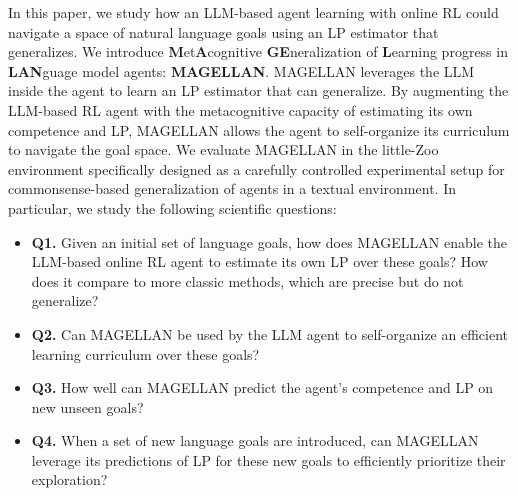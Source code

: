 


In this paper, we study how an LLM-based agent learning with online RL could navigate a space of natural language goals using an LP estimator that generalizes. We introduce \textbf{M}et\textbf{A}cognitive \textbf{GE}neralization of \textbf{L}earning progress in \textbf{LAN}guage model agents: \textbf{MAGELLAN}. MAGELLAN leverages the LLM inside the agent to learn an LP estimator that can generalize. By augmenting the LLM-based RL agent with the metacognitive capacity of estimating its own competence and LP, MAGELLAN allows the agent to self-organize its curriculum to navigate the goal space. We evaluate MAGELLAN in the little-Zoo environment specifically designed as a carefully controlled experimental setup for commonsense-based generalization of agents in a textual environment. In particular, we study the following scientific questions:
\begin{itemize}
    \item \textbf{Q1.} Given an initial set of language goals, how does MAGELLAN enable the LLM-based online RL agent to estimate its own LP over these goals? How does it compare to more classic methods, which are precise but do not generalize?
    \item \textbf{Q2.} Can MAGELLAN be used by the LLM agent to self-organize an efficient learning curriculum over these goals?
    \item \textbf{Q3.} How well can MAGELLAN predict the agent’s competence and LP on new unseen goals?
    \item \textbf{Q4.} When a set of new language goals are introduced, can MAGELLAN leverage its predictions of LP for these new goals to efficiently prioritize their exploration?
\end{itemize}


